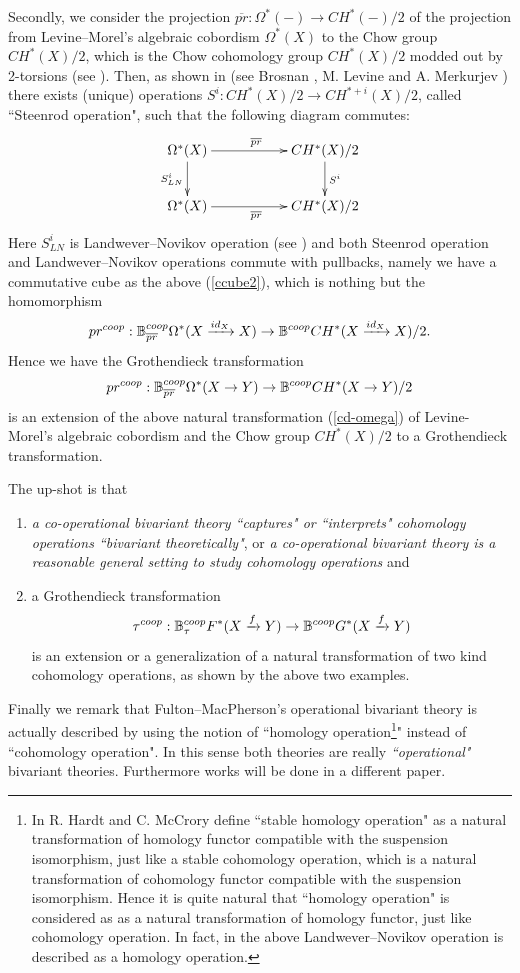 \documentclass[a4paper]{amsart}
\begin{document}
Secondly, we consider the projection $\overline{pr}: \Omega^*(-) \to CH^*(-)/2$ of the projection from Levine--Morel's algebraic cobordism $\Omega^*(X)$ to the Chow group $CH^*(X)/2$, which is the Chow cohomology group $CH^*(X)/2$ modded out by 2-torsions (see \cite{Vishik}). Then, as shown in \cite{Vishik} (see Brosnan \cite{Bros}, M. Levine \cite{Levine} and A. Merkurjev \cite{Merk})  there exists (unique) operations $S^i:CH^*(X)/2 \to CH^{*+i}(X)/2$, called ``Steenrod operation", such that the following diagram commutes:
\begin{equation}\label{cd-omega}
\xymatrix
{\Omega^*(X) \ar[d]_{S^i_{LN}} \ar[rr]^{\overline{pr}} && CH^*(X)/2 \ar[d]^{S^i}\\
\Omega^*(X) \ar[rr]_{\overline{pr}} && CH^*(X)/2
}
\end{equation}
Here $S^i_{LN}$ is Landwever--Novikov operation (see \cite{LM}) and both Steenrod operation and Landwever--Novikov operations commute with pullbacks, namely we have a commutative cube as the above (\ref{ccube2}), which is nothing but the homomorphism
$$pr^{coop}: \mathbb B^{coop}_{\overline{pr}}\Omega^*(X \xrightarrow {id_X} X) \to \mathbb B^{coop}CH^*(X \xrightarrow {id_X} X)/2.$$
Hence we have the Grothendieck transformation
$$pr^{coop}: \mathbb B^{coop}_{\overline{pr}}\Omega^*(X \to Y) \to \mathbb B^{coop}CH^*(X \to Y)/2$$
is an extension of the above natural transformation (\ref{cd-omega}) of Levine-Morel's algebraic cobordism  and the Chow group $CH^*(X)/2$ to a Grothendieck transformation.

The up-shot is that 
\begin{enumerate}
\item \emph{a co-operational bivariant theory ``captures" or ``interprets" cohomology operations ``bivariant theoretically"}, or \emph{a co-operational bivariant theory is a reasonable general setting to study cohomology operations} and 
\item a Grothendieck transformation
$$\tau^{coop}: \mathbb B^{coop}_{\tau}F^*(X \xrightarrow f Y) \to \mathbb B^{coop}G^*(X \xrightarrow f Y)$$
is an extension or a generalization of a natural transformation of two kind cohomology operations, as shown by the above two examples.
\end{enumerate}

Finally we remark that Fulton--MacPherson's operational bivariant theory is actually described by using the notion of ``homology operation\footnote{In \cite[3.1 Definition]{HM} R. Hardt and C. McCrory define ``stable homology operation" as a natural transformation of homology functor compatible with the suspension isomorphism, just like a stable cohomology operation, which is a natural transformation of cohomology functor compatible with the suspension isomorphism. Hence it is quite natural that ``homology operation" is considered as as a natural transformation of homology functor, just like cohomology operation. In fact, in \cite[Example 4.1.25]{LM} the above Landwever--Novikov operation is described as a homology operation.}" instead of ``cohomology operation". In this sense both theories are really \emph{``operational"} bivariant theories. Furthermore works will be done in a different paper.
\end{document}
